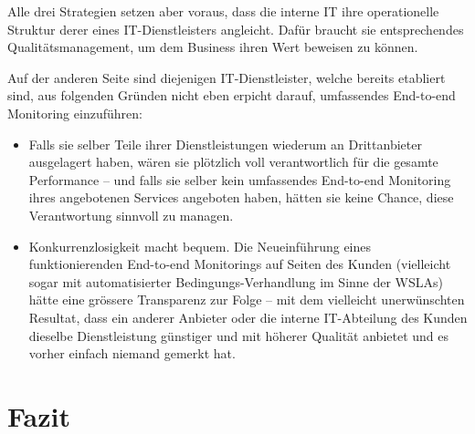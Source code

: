 \documentclass[11pt,listof=totoc]{scrreprt} %
\theoremstyle{definition}
\begin{document}
Alle drei Strategien setzen aber voraus, dass die interne IT ihre operationelle Struktur derer eines IT-Dienstleisters angleicht. Dafür braucht sie entsprechendes Qualitätsmanagement, um dem Business ihren Wert beweisen zu können.

Auf der anderen Seite sind diejenigen IT-Dienstleister, welche bereits etabliert sind, aus folgenden Gründen nicht eben erpicht darauf, umfassendes End-to-end Monitoring einzuführen:

\begin{itemize}
\item Falls sie selber Teile ihrer Dienstleistungen wiederum an Drittanbieter ausgelagert haben, wären sie plötzlich voll verantwortlich für die gesamte Performance -- und falls sie selber kein umfassendes End-to-end Monitoring ihres angebotenen Services angeboten haben, hätten sie keine Chance, diese Verantwortung sinnvoll zu managen.
\item Konkurrenzlosigkeit macht bequem. Die Neueinführung eines funktionierenden End-to-end Monitorings auf Seiten des Kunden (vielleicht sogar mit automatisierter Bedingungs-Verhandlung im Sinne der WSLAs) hätte eine grössere Transparenz zur Folge -- mit dem vielleicht unerwünschten Resultat, dass ein anderer Anbieter oder die interne IT-Abteilung des Kunden dieselbe Dienstleistung günstiger und mit höherer Qualität anbietet und es vorher einfach niemand gemerkt hat.
\end{itemize}

\chapter{Fazit}
\label{fazit}

\listoffigures



\end{document}
